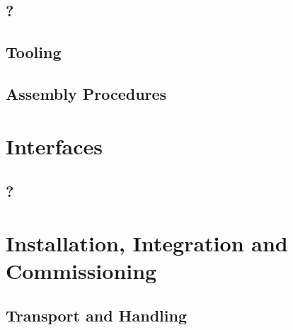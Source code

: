 \subsection{?}
\label{sec:fdsp-slow-cryo-??}



\subsection{Tooling}
\label{sec:fdsp-slow-cryo-tooling}


\subsection{Assembly Procedures}
\label{sec:fdsp-slow-cryo-assy}



\section{Interfaces}
\label{sec:fdsp-slow-cryo-intfc}



\subsection{?}
\label{sec:fdsp-slow-cryo-intfc-?}





\section{Installation, Integration and Commissioning}
\label{sec:fdsp-slow-cryo-install}

\subsection{Transport and Handling}
\label{sec:fdsp-slow-cryo-install-transport}


